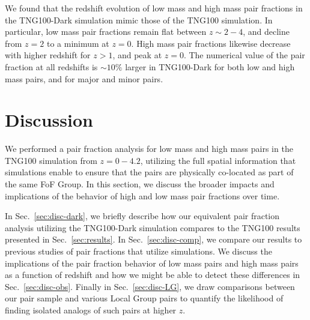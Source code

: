 \documentclass[twocolumn]{aastex631}
\begin{document}
    We found that the redshift evolution of low mass and high mass pair fractions in the TNG100-Dark simulation mimic those of the TNG100 simulation. 
    In particular, low mass pair fractions remain flat between $z\sim2-4$, and decline from $z=2$ to a minimum at $z=0$. 
    High mass pair fractions likewise decrease with higher redshift for $z>1$, and peak at $z=0$.
    The numerical value of the pair fraction at all redshifts is $\sim10\%$ larger in TNG100-Dark for both low and high mass pairs, and for major and minor pairs. 

    


\section{Discussion}\label{sec:discussion}
We performed a pair fraction analysis for low mass and high mass pairs in the TNG100 simulation from $z=0-4.2$, utilizing the full spatial information that simulations enable to ensure that the pairs are physically co-located as part of the same FoF Group. 
In this section, we discuss the broader impacts and implications of the behavior of high and low mass pair fractions over time.

In Sec.~\ref{sec:disc-dark}, we briefly describe how our equivalent pair fraction analysis utilizing the TNG100-Dark simulation compares to the TNG100 results presented in Sec.~\ref{sec:results}. 
In Sec.~\ref{sec:disc-comp}, we compare our results to previous studies of pair fractions that utilize simulations. 
We discuss the implications of the pair fraction behavior of low mass pairs and high mass pairs as a function of redshift and how we might be able to detect these differences in Sec.~\ref{sec:disc-obs}.
Finally in Sec.~\ref{sec:disc-LG}, we draw comparisons between our pair sample and various Local Group pairs to quantify the likelihood of finding isolated analogs of such pairs at higher $z$.
\end{document}
